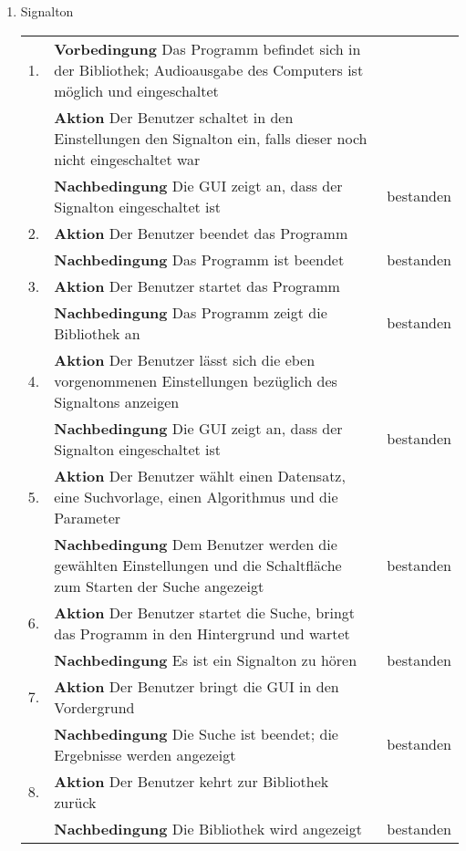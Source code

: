 \begin{enumerate} [label=\bfseries /TSW \arabic*0/, leftmargin=*]
	\item Signalton \label{ts:signalton} \newline \newline
	\begin{tabular}{rp{4in}|l}
	1. & \textbf{Vorbedingung} Das Programm befindet sich in der Bibliothek; Audioausgabe des Computers ist möglich und eingeschaltet & \\
	   & \textbf{Aktion} Der Benutzer schaltet in den Einstellungen den Signalton ein, falls dieser noch nicht eingeschaltet war & \\ 
	   & \textbf{Nachbedingung} Die GUI zeigt an, dass der Signalton eingeschaltet ist & bestanden \\
	\hline
	2. & \textbf{Aktion} Der Benutzer beendet das Programm & \\
	   & \textbf{Nachbedingung} Das Programm ist beendet & bestanden \\
	\hline
	3. & \textbf{Aktion} Der Benutzer startet das Programm & \\
	   & \textbf{Nachbedingung} Das Programm zeigt die Bibliothek an & bestanden \\
	\hline
	4. & \textbf{Aktion} Der Benutzer lässt sich die eben vorgenommenen Einstellungen bezüglich des Signaltons anzeigen & \\
	   & \textbf{Nachbedingung} Die GUI zeigt an, dass der Signalton eingeschaltet ist & bestanden \\
	\hline
	5. & \textbf{Aktion} Der Benutzer wählt einen Datensatz, eine Suchvorlage, einen Algorithmus und die Parameter & \\
	   & \textbf{Nachbedingung} Dem Benutzer werden die gewählten Einstellungen und die Schaltfläche zum Starten der Suche angezeigt & bestanden \\
	\hline
	6. & \textbf{Aktion} Der Benutzer startet die Suche, bringt das Programm in den Hintergrund und wartet & \\
	   & \textbf{Nachbedingung} Es ist ein Signalton zu hören & bestanden \\
	\hline
	7. & \textbf{Aktion} Der Benutzer bringt die GUI in den Vordergrund & \\
	   & \textbf{Nachbedingung} Die Suche ist beendet; die Ergebnisse werden angezeigt & bestanden \\
	\hline
	8. & \textbf{Aktion} Der Benutzer kehrt zur Bibliothek zurück & \\
	   & \textbf{Nachbedingung} Die Bibliothek wird angezeigt & bestanden \\

\end{tabular}
\end{enumerate}
